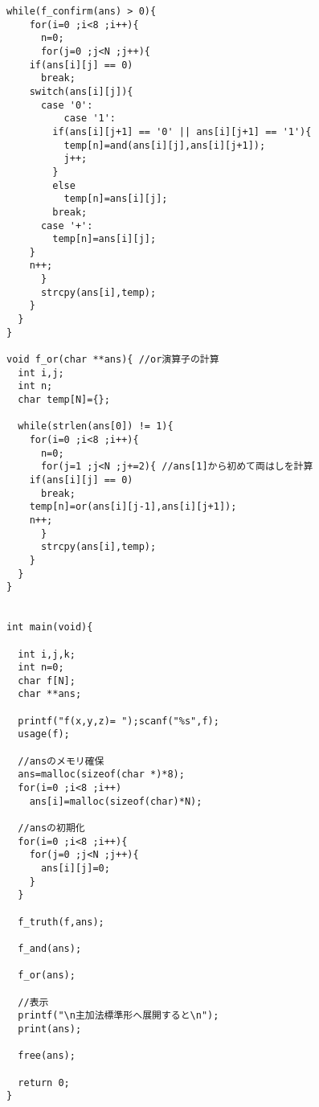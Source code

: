 \documentclass[a4j]{jarticle} %
\begin{document}
\begin{lstlisting}[caption=hoge,label=fuga]
  while(f_confirm(ans) > 0){
    for(i=0 ;i<8 ;i++){
      n=0;
      for(j=0 ;j<N ;j++){
	if(ans[i][j] == 0)
	  break;
	switch(ans[i][j]){
	  case '0':
          case '1':
	    if(ans[i][j+1] == '0' || ans[i][j+1] == '1'){
	      temp[n]=and(ans[i][j],ans[i][j+1]);
	      j++;
	    }
	    else
	      temp[n]=ans[i][j];
	    break;
	  case '+':
	    temp[n]=ans[i][j];
	}
	n++;
      }
      strcpy(ans[i],temp); 
    }
  }
}

void f_or(char **ans){ //or演算子の計算
  int i,j;
  int n;
  char temp[N]={};

  while(strlen(ans[0]) != 1){
    for(i=0 ;i<8 ;i++){
      n=0;
      for(j=1 ;j<N ;j+=2){ //ans[1]から初めて両はしを計算
	if(ans[i][j] == 0)
	  break;
	temp[n]=or(ans[i][j-1],ans[i][j+1]);
	n++;	
      }
      strcpy(ans[i],temp);
    }
  }
}
  
  
int main(void){

  int i,j,k;
  int n=0;
  char f[N];
  char **ans;

  printf("f(x,y,z)= ");scanf("%s",f);
  usage(f);
  
  //ansのメモリ確保
  ans=malloc(sizeof(char *)*8);
  for(i=0 ;i<8 ;i++)
    ans[i]=malloc(sizeof(char)*N);
  
  //ansの初期化
  for(i=0 ;i<8 ;i++){
    for(j=0 ;j<N ;j++){
      ans[i][j]=0;
    }
  }
  
  f_truth(f,ans);

  f_and(ans);

  f_or(ans);
  
  //表示
  printf("\n主加法標準形へ展開すると\n");
  print(ans);
  
  free(ans);
  
  return 0;
}

\end{lstlisting}
\end{document}
